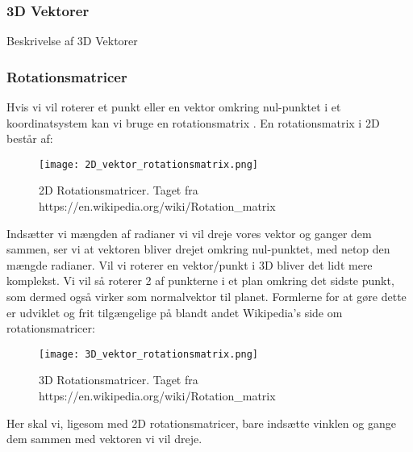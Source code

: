 \subsubsection{3D Vektorer}

\<Beskrivelse af 3D Vektorer\>


\subsubsection{Rotationsmatricer}
Hvis vi vil roterer et punkt eller en vektor omkring nul-punktet i et koordinatsystem kan vi bruge en rotationsmatrix \cite{rotationsmatricer}. En rotationsmatrix i 2D består af:
\begin{figure}[H]
  \centering
  \texttt{[image: 2D\_vektor\_rotationsmatrix.png]}
  \caption{2D Rotationsmatricer. Taget fra https://en.wikipedia.org/wiki/Rotation\_matrix}
\end{figure}
Indsætter vi mængden af radianer vi vil dreje vores vektor og ganger dem sammen, ser vi at vektoren bliver drejet omkring nul-punktet, med netop den mængde radianer. 
Vil vi roterer en vektor/punkt i 3D bliver det lidt mere komplekst. Vi vil så roterer 2 af punkterne i et plan omkring det sidste punkt, som dermed også virker som normalvektor til planet. Formlerne for at gøre dette er udviklet og frit tilgængelige på blandt andet Wikipedia's side om rotationsmatricer:
\begin{figure}[H]
  \centering
  \texttt{[image: 3D\_vektor\_rotationsmatrix.png]}
  \caption{3D Rotationsmatricer. Taget fra https://en.wikipedia.org/wiki/Rotation\_matrix}
\end{figure}
Her skal vi, ligesom med 2D rotationsmatricer, bare indsætte vinklen og gange dem sammen med vektoren vi vil dreje.